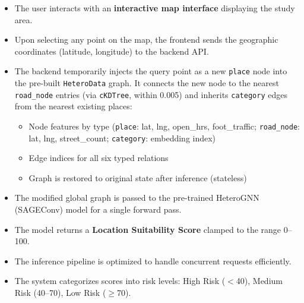 \begin{itemize}
    \item The user interacts with an \textbf{interactive map interface} displaying the study area.
	\item Upon selecting any point on the map, the frontend sends the geographic coordinates (latitude, longitude) to the backend API.
	\item The backend temporarily injects the query point as a new \texttt{place} node into the pre-built \texttt{HeteroData} graph. It connects the new node to the nearest \texttt{road\_node} entries (via \texttt{cKDTree}, within 0.005\textdegree) and inherits \texttt{category} edges from the nearest existing places:
	\begin{itemize}
		\item Node features by type (\texttt{place}: lat, lng, open\_hrs, foot\_traffic; \texttt{road\_node}: lat, lng, street\_count; \texttt{category}: embedding index)
		\item Edge indices for all six typed relations
		\item Graph is restored to original state after inference (stateless)
	\end{itemize}
	\item The modified global graph is passed to the pre-trained HeteroGNN (SAGEConv) model for a single forward pass.
	\item The model returns a \textbf{Location Suitability Score} clamped to the range 0--100.
	\item The inference pipeline is optimized to handle concurrent requests efficiently.
	\item The system categorizes scores into risk levels: High Risk ($<$40), Medium Risk (40--70), Low Risk ($\geq$70).
\end{itemize}



